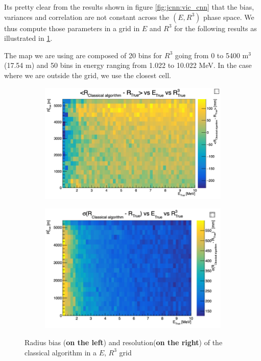 \documentclass[../main.tex]{subfiles}
\begin{document}
Its pretty clear from the results shown in figure \ref{fig:jcnn:vic_cnn} that the bias, variances and correlation are not constant across the $(E, R^3)$ phase space. We thus compute those parameters in a grid in $E$ and $R^3$ for the following results as illustrated in \ref{fig:jcnn:vic_cnn:res_map}.

The map we are using are composed of 20 bins for $R^3$ going from 0 to 5400 m$^3$ (17.54 m) and 50 bins in energy ranging from 1.022 to 10.022 MeV. In the case where we are outside the grid, we use the closest cell.

\begin{figure}
  \centering
  \begin{subfigure}[t]{0.48\linewidth}
    \includegraphics[width=\linewidth]{images/jcnn/vic_cnn/vic_r_bias.png}
  \end{subfigure}
  \hfill
  \begin{subfigure}[t]{0.48\linewidth}
    \includegraphics[width=\linewidth]{images/jcnn/vic_cnn/vic_r_res.png}
  \end{subfigure}
  \caption{Radius bias (\textbf{on the left}) and resolution(\textbf{on the right}) of the classical algorithm in a $E$, $R^3$ grid}
  \label{fig:jcnn:vic_cnn:res_map}
\end{figure}
\end{document}
